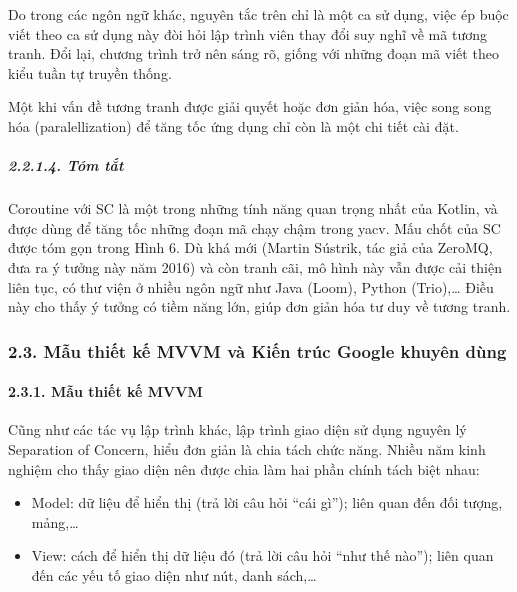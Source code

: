 Do trong các ngôn ngữ khác, nguyên tắc trên chỉ là một ca sử dụng, việc
ép buộc viết theo ca sử dụng này đòi hỏi lập trình viên thay đổi suy
nghĩ về mã tương tranh. Đổi lại, chương trình trở nên sáng rõ, giống với
những đoạn mã viết theo kiểu tuần tự truyền thống.

Một khi vấn đề tương tranh được giải quyết hoặc đơn giản hóa, việc song
song hóa (paralellization) để tăng tốc ứng dụng chỉ còn là một chi tiết
cài đặt.

\hypertarget{tuxf3m-tux1eaft}{%
  \subparagraph{2.2.1.4. Tóm tắt}\label{tuxf3m-tux1eaft}}

Coroutine với SC là một trong những tính năng quan trọng nhất của
Kotlin, và được dùng để tăng tốc những đoạn mã chạy chậm trong yacv. Mấu
chốt của SC được tóm gọn trong Hình 6. Dù khá mới (Martin Sústrik, tác
giả của ZeroMQ, đưa ra ý tưởng này năm 2016) và còn tranh cãi, mô hình
này vẫn được cải thiện liên tục, có thư viện ở nhiều ngôn ngữ như Java
(Loom), Python (Trio),\ldots{} Điều này cho thấy ý tưởng có tiềm năng
lớn, giúp đơn giản hóa tư duy về tương tranh.

\hypertarget{mux1eabu-thiux1ebft-kux1ebf-mvvm-vuxe0-kiux1ebfn-truxfac-google-khuyuxean-duxf9ng}{%
  \subsubsection{\texorpdfstring{2.3. Mẫu thiết kế MVVM và Kiến trúc Google khuyên dùng
    }{2.3. Mẫu thiết kế MVVM và Kiến trúc Google khuyên dùng }}\label{mux1eabu-thiux1ebft-kux1ebf-mvvm-vuxe0-kiux1ebfn-truxfac-google-khuyuxean-duxf9ng}}

\hypertarget{mux1eabu-thiux1ebft-kux1ebf-mvvm}{%
  \paragraph{\texorpdfstring{2.3.1. Mẫu thiết kế MVVM
    }{2.3.1. Mẫu thiết kế MVVM }}\label{mux1eabu-thiux1ebft-kux1ebf-mvvm}}

Cũng như các tác vụ lập trình khác, lập trình giao diện sử dụng nguyên
lý Separation of Concern, hiểu đơn giản là chia tách chức năng. Nhiều
năm kinh nghiệm cho thấy giao diện nên được chia làm hai phần chính tách
biệt nhau:

\begin{itemize}
  
  \item
        Model: dữ liệu để hiển thị (trả lời câu hỏi ``cái gì''); liên quan đến
        đối tượng, mảng,\ldots{}
  \item
        View: cách để hiển thị dữ liệu đó (trả lời câu hỏi ``như thế nào'');
        liên quan đến các yếu tố giao diện như nút, danh sách,\ldots{}
\end{itemize}


